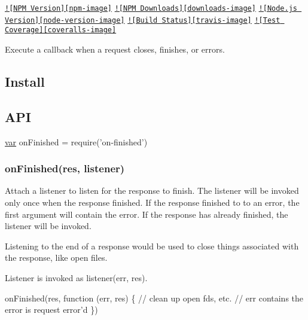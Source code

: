 \href{https://npmjs.org/package/on-finished}{\tt !\mbox{[}N\+P\+M Version\mbox{]}\mbox{[}npm-\/image\mbox{]}} \href{https://npmjs.org/package/on-finished}{\tt !\mbox{[}N\+P\+M Downloads\mbox{]}\mbox{[}downloads-\/image\mbox{]}} \href{http://nodejs.org/download/}{\tt !\mbox{[}Node.\+js Version\mbox{]}\mbox{[}node-\/version-\/image\mbox{]}} \href{https://travis-ci.org/jshttp/on-finished}{\tt !\mbox{[}Build Status\mbox{]}\mbox{[}travis-\/image\mbox{]}} \href{https://coveralls.io/r/jshttp/on-finished?branch=master}{\tt !\mbox{[}Test Coverage\mbox{]}\mbox{[}coveralls-\/image\mbox{]}}

Execute a callback when a request closes, finishes, or errors.

\subsection*{Install}




\subsection*{A\+P\+I}


\begin{DoxyCode}
\hyperlink{018__def_8c_a335628f2e9085305224b4f9cc6e95ed5}{var} onFinished = require(\textcolor{stringliteral}{'on-finished'})
\end{DoxyCode}


\subsubsection*{on\+Finished(res, listener)}

Attach a listener to listen for the response to finish. The listener will be invoked only once when the response finished. If the response finished to to an error, the first argument will contain the error. If the response has already finished, the listener will be invoked.

Listening to the end of a response would be used to close things associated with the response, like open files.

Listener is invoked as {\ttfamily listener(err, res)}.


\begin{DoxyCode}
onFinished(res, \textcolor{keyword}{function} (err, res) \{
  \textcolor{comment}{// clean up open fds, etc.}
  \textcolor{comment}{// err contains the error is request error'd}
\})
\end{DoxyCode}


